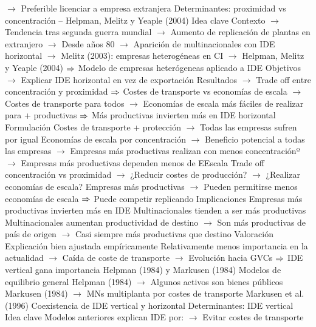 \documentclass{nuevotema}
\begin{document}
\begin{esquemal}
				\4[] $\to$ Preferible licenciar a empresa extranjera
			\3 Determinantes: proximidad vs concentración -- Helpman, Melitz y Yeaple (2004)
				\4 Idea clave
				\4[] Contexto
				\4[] $\to$ Tendencia tras segunda guerra mundial
				\4[] $\to$ Aumento de replicación de plantas en extranjero
				\4[] $\to$ Desde años 80
				\4[] $\to$ Aparición de multinacionales con IDE horizontal
				\4[] $\to$ Melitz (2003): empresas heterogéneas en CI
				\4[] $\to$ Helpman, Melitz y Yeaple (2004)
				\4[] $\Rightarrow$ Modelo de empresas heterógeneas aplicado a IDE
				\4[] Objetivos
				\4[] $\to$ Explicar IDE horizontal en vez de exportación
				\4[] Resultados
				\4[] $\to$ Trade off entre concentración y proximidad
				\4[] $\Rightarrow$ Costes de transporte vs economías de escala
				\4[] $\to$ Costes de transporte para todos
				\4[] $\to$ Economías de escala más fáciles de realizar para + productivas
				\4[] $\Rightarrow$ Más productivas invierten más en IDE horizontal
				\4 Formulación
				\4[] Costes de transporte + protección
				\4[] $\to$ Todas las empresas sufren por igual
				\4[] Economías de escala por concentración
				\4[] $\to$ Beneficio potencial a todas las empresas
				\4[] $\to$ Empresas más productivas realizan con menos concentraciónº
				\4[] $\to$ Empresas más productivas dependen menos de EEscala
				\4[] Trade off concentración vs proximidad
				\4[] $\to$ ¿Reducir costes de producción?
				\4[] $\to$ ¿Realizar economías de escala?
				\4[] Empresas más productivas
				\4[] $\to$ Pueden permitirse menos economías de escala
				\4[] $\Rightarrow$ Puede competir replicando
				\4 Implicaciones
				\4[] Empresas más productivas invierten más en IDE
				\4[] Multinacionales tienden a ser más productivas
				\4[] Multinacionales aumentan productividad de destino
				\4[] $\to$ Son más productivas de país de origen
				\4[] $\to$ Casi siempre más productivas que destino
				\4 Valoración
				\4[] Explicación bien ajustada empíricamente
				\4[] Relativamente menos importancia en la actualidad
				\4[] $\to$ Caída de coste de transporte
				\4[] $\to$ Evolución hacia GVCs
				\4[] $\Rightarrow$ IDE vertical gana importancia
				\4 Helpman (1984) y Markusen (1984)
				\4[] Modelos de equilibrio general
				\4[] Helpman (1984)
				\4[] $\to$ Algunos activos son bienes públicos
				\4[] Markusen (1984)
				\4[] $\to$ MNs multiplanta por costes de transporte
				\4 Markusen et al. (1996)
				\4[] Coexistencia de IDE vertical y horizontal
			\3 Determinantes: IDE vertical
				\4 Idea clave
				\4[] Modelos anteriores explican IDE por:
				\4[] $\to$ Evitar costes de transporte

\end{esquemal}
\end{document}
